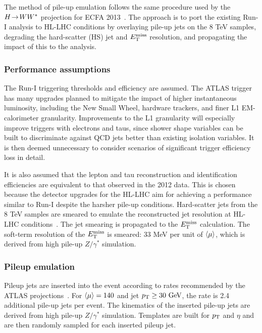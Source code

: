 The method of pile-up emulation follows the same procedure used by the $H \!\rightarrow\! WW^\ast$ projection for ECFA 2013~\cite{ATL-PHYS-PUB-2013-014}. The approach is to port the existing Run-I analysis to HL-LHC conditions by overlaying pile-up jets on the 8 TeV samples, degrading the hard-scatter (HS) jet and $E_{\mathrm{T}}^{\mathrm{miss}}$ resolution, and propagating the impact of this to the analysis.

\subsubsection{Performance assumptions}

The Run-I triggering thresholds and efficiency are assumed. The ATLAS trigger has many upgrades planned to mitigate the impact of higher instantaneous luminosity, including the New Small Wheel, hardware trackers, and finer L1 EM-calorimeter granularity. Improvements to the L1 granularity will especially improve triggers with electrons and taus, since shower shape variables can be built to discriminate against QCD jets better than existing isolation variables. It is then deemed unnecessary to consider scenarios of significant trigger efficiency loss in detail.

It is also assumed that the lepton and tau reconstruction and identification efficiencies are equivalent to that observed in the 2012 data. This is chosen because the detector upgrades for the HL-LHC aim for achieving a performance similar to Run-I despite the harsher pile-up conditions. Hard-scatter jets from the 8 TeV samples are smeared to emulate the reconstructed jet resolution at HL-LHC conditions~\cite{ATL-PHYS-PUB-2013-004}. The jet smearing is propagated to the $E_{\mathrm{T}}^{\mathrm{miss}}$ calculation. The soft-term resolution of the $E_{\mathrm{T}}^{\mathrm{miss}}$ is smeared: 33 MeV per unit of $\langle\mu\rangle$, which is derived from high pile-up $Z/\gamma^\ast$ simulation.

\subsubsection{Pileup emulation}

Pileup jets are inserted into the event according to rates recommended by the ATLAS projections~\cite{ATL-PHYS-PUB-2013-004}. For $\langle\mu\rangle=140$ and jet $\pt \ge 30 \GeV$, the rate is 2.4 additional pile-up jets per event. The kinematics of the inserted pile-up jets are derived from high pile-up $Z/\gamma^\ast$ simulation. Templates are built for $p_{\mathrm{T}}$ and $\eta$ and are then randomly sampled for each inserted pileup jet. 


